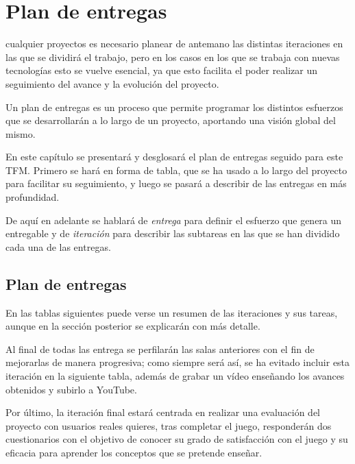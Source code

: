 \chapter{Plan de entregas}
\label{chap:plan_entregas}

 cualquier proyectos es necesario planear de antemano las distintas iteraciones en las que se dividirá el trabajo, pero en los casos en los que se trabaja con nuevas tecnologías esto se vuelve esencial, ya que esto facilita el poder realizar un seguimiento del avance y la evolución del proyecto.

Un plan de entregas es un proceso que permite programar los distintos esfuerzos que se desarrollarán a lo largo de un proyecto, aportando  una visión global del mismo.

En este capítulo se presentará y desglosará el plan de entregas seguido para este \acs{TFM}. Primero se hará en forma de tabla, que se ha usado a lo largo del proyecto para facilitar su seguimiento, y luego se pasará a describir de las entregas en más profundidad.

De aquí en adelante se hablará de \textit{entrega} para definir el esfuerzo que genera un entregable y de \textit{iteración} para describir las subtareas en las que se han dividido cada una de las entregas.

\section{Plan de entregas}

En las tablas siguientes puede verse un resumen de las iteraciones y sus tareas, aunque en la sección posterior se explicarán con más detalle.

Al final de todas las entrega se perfilarán las salas anteriores con el fin de mejorarlas de manera progresiva; como siempre será así, se ha evitado incluir esta iteración en la siguiente tabla, además de grabar un vídeo enseñando los avances obtenidos y subirlo a YouTube. 

Por último, la iteración final estará centrada en realizar una evaluación del proyecto con usuarios reales quieres, tras completar el juego, responderán dos cuestionarios con el objetivo de conocer su grado de satisfacción con el juego y su eficacia para aprender los conceptos que se pretende enseñar.


\vspace{1cm}

